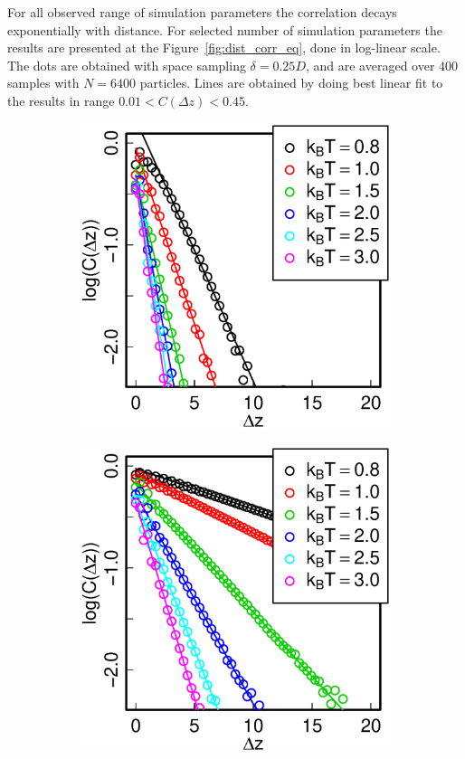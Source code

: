 For all observed range of simulation parameters the correlation decays exponentially with distance. For selected number of simulation parameters the results are presented at the Figure~\ref{fig:dist_corr_eq}, done in log-linear scale. The dots are obtained with space sampling $\delta = 0.25D$, and are averaged over $400$ samples with $N = 6400$ particles. Lines are obtained by doing best linear fit to the results in range $0.01 < C(\Delta z) < 0.45$.
\begin{figure}[t]
\centering
\begin{subfigure}[t]{0.32\textwidth}
	\centering
	\includegraphics[width=\textwidth]{Images/distCor_25}
\end{subfigure}
\begin{subfigure}[t]{0.32\textwidth}
	\centering
	\includegraphics[width=\textwidth]{Images/distCor_75}

\end{subfigure}
\end{figure}

